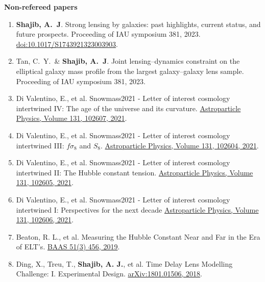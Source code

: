 \documentclass[margin, line]{res}
\begin{document}
\begin{resume}
\textbf{Non-refereed papers}
\begin{enumerate}
	\item \textbf{Shajib, A.~J}. Strong lensing by galaxies: past highlights, current status, and future prospects. Proceeding of IAU symposium 381, 2023. \href{https://arxiv.org/abs/2310.07695}{doi:10.1017/S1743921323003903}.
	\item Tan, C.~Y.\mentee~\& \textbf{Shajib, A.~J}. Joint lensing--dynamics constraint on the elliptical galaxy mass profile from the largest galaxy--galaxy lens sample. Proceeding of IAU symposium 381, 2023.
	\item Di Valentino, E., et al. Snowmass2021 - Letter of interest cosmology intertwined IV: The age of the universe and its curvature. \href{https://www.sciencedirect.com/science/article/abs/pii/S0927650521000517}{Astroparticle Physics, Volume 131, 102607, 2021}.
	\item Di Valentino, E., et al. Snowmass2021 - Letter of interest cosmology intertwined III: $f\sigma_8$ and $S_8$. \href{https://www.sciencedirect.com/science/article/abs/pii/S0927650521000487}{Astroparticle Physics, Volume 131, 102604, 2021}.
	\item Di Valentino, E., et al. Snowmass2021 - Letter of interest cosmology intertwined II: The Hubble constant tension. \href{https://www.sciencedirect.com/science/article/abs/pii/S0927650521000499}{Astroparticle Physics, Volume 131, 102605, 2021}.
	\item Di Valentino, E., et al. Snowmass2021 - Letter of interest cosmology intertwined I: Perspectives for the next decade \href{https://www.sciencedirect.com/science/article/abs/pii/S0927650521000505}{Astroparticle Physics, Volume 131, 102606, 2021}.
	\item Beaton, R. L., et al. Measuring the Hubble Constant Near and Far in the Era of ELT's. \href{https://ui.adsabs.harvard.edu/abs/2019BAAS...51c.456B/abstract}{BAAS 51(3) 456, 	2019}.
	\item Ding, X., Treu, T., {\bf Shajib, A. J.}, et al. Time Delay Lens Modelling Challenge: I. Experimental Design. \href{https://arxiv.org/abs/1801.01506}{arXiv:1801.01506, 2018}.

\end{enumerate}







\end{resume}
\end{document}
